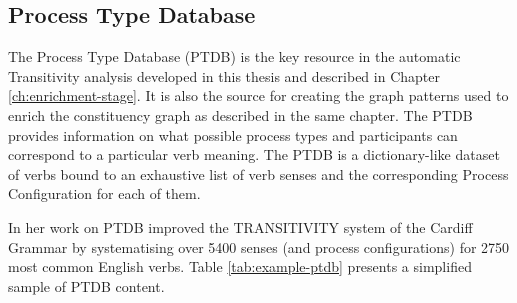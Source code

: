 \subsection{Process Type Database}
\label{sec:ptdb-description-technical}

    The Process Type Database (PTDB) \citep{Neale2002} is the key resource in the automatic Transitivity analysis developed in this thesis and described in Chapter \ref{ch:enrichment-stage}. It is also the source for creating the graph patterns used to enrich the constituency graph as described in the same chapter. The PTDB provides information on what possible process types and participants can correspond to a particular verb meaning. The PTDB is a dictionary-like dataset of verbs bound to an exhaustive list of verb senses and the corresponding Process Configuration for each of them.
    
    In her work on PTDB \citet{Neale2002} improved the TRANSITIVITY system of the Cardiff Grammar by systematising over 5400 senses (and process configurations) for 2750 most common English verbs. Table \ref{tab:example-ptdb} presents a simplified sample of PTDB content.

    \begin{table}[!ht]
        \centering
        \caption{An example of records in PTDB}
        \label{tab:example-ptdb}
    \end{table}

